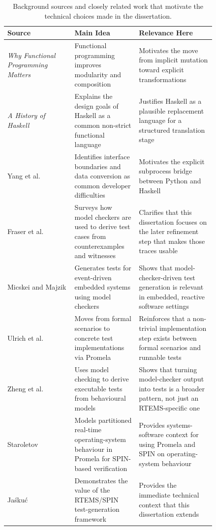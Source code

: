 \begin{table}[H]
\begin{center}
\begin{tabular}{|p{0.28\linewidth}|p{0.24\linewidth}|p{0.32\linewidth}|}
\hline
\textbf{Source} & \textbf{Main Idea} & \textbf{Relevance Here} \\
\hline
\emph{Why Functional Programming Matters} \citep{hughes1989why} &
Functional programming improves modularity and composition &
Motivates the move from implicit mutation toward explicit
transformations \\
\hline
\emph{A History of Haskell} \citep{hudak2007history} & Explains the
design goals of Haskell as a common non-strict functional language &
Justifies Haskell as a plausible replacement language for a structured
translation stage \\
\hline
Yang et al. \citep{yang2024multilanguage} & Identifies interface
boundaries and data conversion as common developer difficulties &
Motivates the explicit subprocess bridge between Python and Haskell \\
\hline
Fraser et al. \citep{fraser2009testing} & Surveys how model checkers
are used to derive test cases from counterexamples and witnesses &
Clarifies that this dissertation focuses on the later refinement step
that makes those traces usable \\
\hline
Micskei and Majzik \citep{micskei2006modelbased} & Generates tests for
event-driven embedded systems using model checkers & Shows that
model-checker-driven test generation is relevant in embedded,
reactive software settings \\
\hline
Ulrich et al. \citep{ulrich2010scenarios} & Moves from formal
scenarios to concrete test implementations via Promela & Reinforces
that a non-trivial implementation step exists between formal
scenarios and runnable tests \\
\hline
Zheng et al. \citep{zheng2007model} & Uses model checking to derive
executable tests from behavioural models & Shows that turning
model-checker output into tests is a broader pattern, not just an
RTEMS-specific one \\
\hline
Staroletov \citep{staroletov2020promela} & Models partitioned
real-time operating-system behaviour in Promela for SPIN-based
verification & Provides systems-software context for using Promela and
SPIN on operating-system behaviour \\
\hline
Ja{\'s}ku{\'c} \citep{jaskuc2022barrier} & Demonstrates the value of
the RTEMS/SPIN test-generation framework & Provides the immediate
technical context that this dissertation extends \\
\hline
\end{tabular}
\end{center}
\caption[Context for the dissertation]{Background sources and closely
related work that motivate the technical choices made in the
dissertation.}
\label{tab:state-of-the-art-context}
\end{table}

